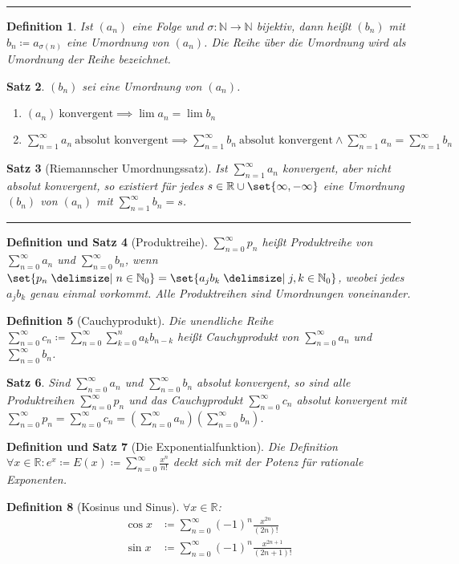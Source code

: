 \documentclass[a4paper]{article}
\newcounter{Sec}
\theoremstyle{marginbreak}
\newtheorem{definition}{Definition}[Sec]
\newtheorem{satz}[definition]{Satz}
\newtheorem{defsatz}[definition]{Definition und Satz}
\newcommand{\sep}{%
	\rule{\textwidth}{0.3pt}%
	\stepcounter{Sec}%
	}
\newcommand{\series}[1][1]{\sum_{n=#1}^\infty}
\begin{document}
	\sep
	\begin{definition}
		Ist $(a_n)$ eine Folge und $\sigma\colon\mathbb{N}\to\mathbb{N}$ bijektiv,
		dann heißt $(b_n)$ mit $b_n\coloneqq a_{\sigma(n)}$ eine Umordnung von
		$(a_n)$. Die Reihe über die Umordnung wird als Umordnung der Reihe bezeichnet.
	\end{definition}
	\begin{satz}
		$(b_n)$ sei eine Umordnung von $(a_n)$.
		\begin{enumerate}[label=(\alph*)]
			\item $(a_n)~\text{konvergent}\implies\lim a_n=\lim b_n$
			\item $\series a_n~\text{absolut konvergent}\implies\series b_n~\text{absolut konvergent}
				\wedge\series a_n=\series b_n$
		\end{enumerate}
	\end{satz}
	\begin{satz}[Riemannscher Umordnungssatz]
		Ist $\series a_n$ konvergent,
		aber nicht absolut konvergent, so existiert für jedes $s\in\mathbb{R}\cup
		\set{\infty,-\infty}$ eine Umordnung $(b_n)$ von $(a_n)$ mit
		$\series b_n = s$.
	\end{satz}
	\sep
	\begin{defsatz}[Produktreihe]
		$\series[0] p_n$ heißt Produktreihe von $\series[0] a_n$ und
		$\series[0] b_n$, wenn $\set{p_n\given n\in\mathbb{N}_0} = \set{a_jb_k\given j,k\in\mathbb{N}_0}$,
		weobei jedes $a_jb_k$ genau einmal vorkommt. Alle Produktreihen sind
		Umordnungen voneinander.
	\end{defsatz}
	\begin{definition}[Cauchyprodukt]
		Die unendliche Reihe $\series[0] c_n\coloneqq\series[0] \sum_{k=0}^n a_kb_{n-k}$ heißt
		Cauchyprodukt von $\series[0] a_n$ und $\series[0] b_n$.
	\end{definition}
	\begin{satz}
		Sind $\series[0] a_n$ und $\series[0] b_n$ absolut konvergent, so sind alle
		Produktreihen $\series[0] p_n$ und das Cauchyprodukt $\series[0] c_n$
		absolut konvergent mit
		$\series[0] p_n = \series[0] c_n = (\series[0] a_n)(\series[0] b_n)$.
	\end{satz}
	\begin{defsatz}[Die Exponentialfunktion]
		Die Definition $\forall x\in\mathbb{R}:e^x\coloneqq E(x)\coloneqq\series[0]\frac{x^n}{n!}$
		deckt sich mit der Potenz für rationale Exponenten.
	\end{defsatz}
	\begin{definition}[Kosinus und Sinus]
		$\forall x\in\mathbb{R}$:
		\begin{align*}
			\cos x &\coloneqq\series[0](-1)^n\frac{x^{2n}}{(2n)!}\\
			\sin x &\coloneqq\series[0](-1)^n\frac{x^{2n+1}}{(2n+1)!}
		\end{align*}
	\end{definition}
\end{document}
